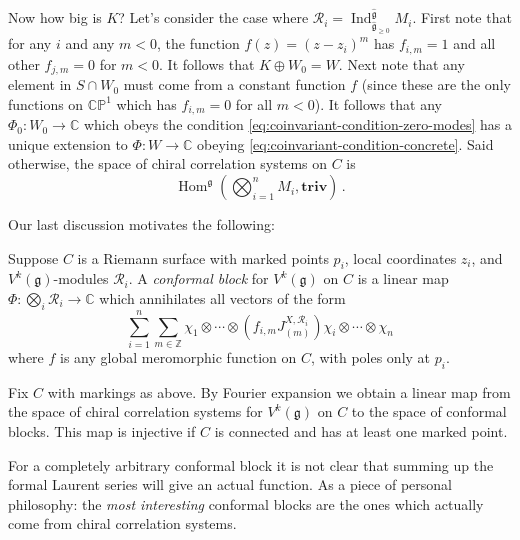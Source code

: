 \documentclass[12pt,letterpaper,reqno]{amsart}
\numberwithin{equation}{section}
\newcommand{\fg}{{\mathfrak g}}
\newcommand{\hfg}{{\widehat\fg}}
\newcommand{\bbC}{\ensuremath{\mathbb C}}
\newcommand{\bbP}{\ensuremath{\mathbb P}}
\newcommand{\bbZ}{\ensuremath{\mathbb Z}}
\newcommand\triv{{\mathbf {triv}}}
\newcommand{\vrep}{\mathcal{R}}
\newcommand{\ti}[1]{\textit{#1}}
\DeclareMathOperator{\Hom}{Hom}
\DeclareMathOperator{\Ind}{Ind}
\begin{document}
\begin{example}
Now how big is $K$? Let's consider the case 
where $\vrep_i = \Ind^{\hfg}_{\hfg_{\ge 0}} M_i$.
First note that for any $i$ and any $m < 0$, the function $f(z) = (z - z_i)^m$
has $f_{i,m} = 1$ and all other $f_{j,m} = 0$ for $m<0$.
It follows that $K \oplus W_0 = W$. Next note that any element in $S \cap W_0$ must
come from a constant function $f$ (since these are the only functions on $\bbC \bbP^1$ which has
$f_{i,m} = 0$ for all $m < 0$).
It follows that any $\Phi_0: W_0 \to \bbC$ which obeys the condition
\eqref{eq:coinvariant-condition-zero-modes} has a unique extension to
$\Phi: W \to \bbC$ obeying \eqref{eq:coinvariant-condition-concrete}.
Said otherwise, the space of chiral correlation systems on $C$ is
\begin{equation}
  \Hom^\fg(\bigotimes_{i=1}^n M_i, \triv) \, .
\end{equation}

\end{example}


Our last discussion motivates the following:

\begin{defn} \label{defn:conformal-block-affine}
Suppose $C$ is a Riemann surface with marked points $p_i$, local coordinates $z_i$, and $V^k(\fg)$-modules $\vrep_i$.
A \ti{conformal block} for $V^k(\fg)$ on $C$ is a linear map $\Phi: \bigotimes_i \vrep_i \to \bbC$ which annihilates
all vectors of the form
\begin{equation}
  \sum_{i=1}^n \sum_{m \in \bbZ} \chi_1 \otimes \cdots \otimes (f_{i,m} J^{X,\vrep_i}_{(m)}) \chi_i \otimes \cdots \otimes \chi_n
\end{equation}
where $f$ is any global meromorphic function on $C$, with poles only at $p_i$.
\end{defn}

\begin{prop} Fix $C$ 
with markings as above. By Fourier expansion we obtain a linear map from the space of chiral correlation systems
for $V^k(\fg)$ on $C$ to the space of conformal blocks. This map is injective if $C$ is connected and has at least
one marked point.
\end{prop}

For a completely arbitrary conformal block it is not clear that summing up the formal Laurent series will give 
an actual function.
As a piece of personal philosophy: the \ti{most interesting} conformal blocks are the ones which actually come
from chiral correlation systems.
\end{document}
